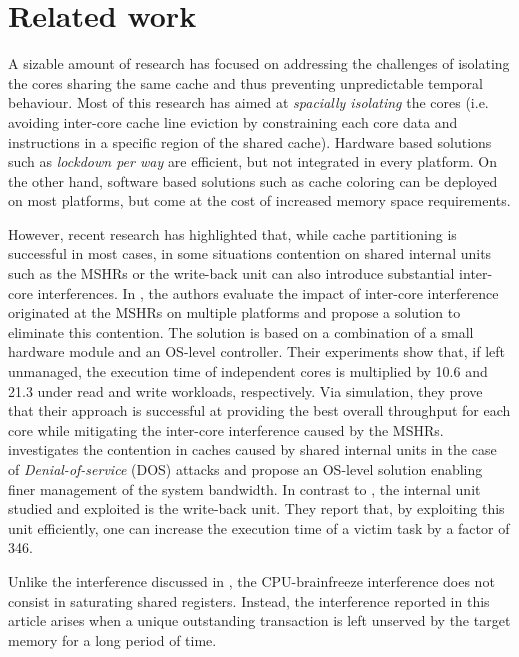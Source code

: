 \section{Related work}
    A sizable amount of research has focused on addressing the challenges of isolating the cores sharing the same cache and thus preventing unpredictable temporal behaviour.
    Most of this research \cite{Mancuso2013RealtimeCM, 6755286} has aimed at \emph{spacially isolating} the cores (i.e. avoiding inter-core cache line eviction by constraining each core data and instructions in a specific region of the shared cache).
    Hardware based solutions such as \emph{lockdown per way} \cite{Giovani_cahe_partitioning_survey} are efficient, but not integrated in every platform.
    On the other hand, software based solutions such as cache coloring \cite{Mancuso2013RealtimeCM} can be deployed on most platforms, but come at the cost of increased memory space requirements.

    However, recent research \cite{Valsan2017AddressingIC, Heechul_DDOS_attacks_on_shared_cache} has highlighted that, while cache partitioning is successful in most cases, in some situations contention on shared internal units such as the MSHRs or the write-back unit can also introduce substantial inter-core interferences.
    In \cite{Valsan2017AddressingIC}, the authors evaluate the impact of inter-core interference originated at the MSHRs on multiple platforms and propose a solution to eliminate this contention. The solution is based on a combination of a small hardware module and an OS-level controller.
    Their experiments show that, if left unmanaged, the execution time of independent cores is multiplied by 10.6 and 21.3 under read and write workloads, respectively.
    Via simulation, they prove that their approach is successful at providing the best overall throughput for each core while mitigating the inter-core interference caused by the MSHRs.
    \cite{Heechul_DDOS_attacks_on_shared_cache} investigates the contention in caches caused by shared internal units in the case of \emph{Denial-of-service} (DOS) attacks and propose an OS-level solution enabling finer management of the system bandwidth.
    In contrast to \cite{Valsan2017AddressingIC}, the internal unit studied and exploited is the write-back unit.
    They report that, by exploiting this unit efficiently, one can increase the execution time of a victim task by a factor of 346.

    Unlike the interference discussed in \cite{Valsan2017AddressingIC, Heechul_DDOS_attacks_on_shared_cache}, the CPU-brainfreeze interference does not consist in saturating shared registers. Instead, the interference reported in this article arises when a unique outstanding transaction is left unserved by the target memory for a long period of time.
